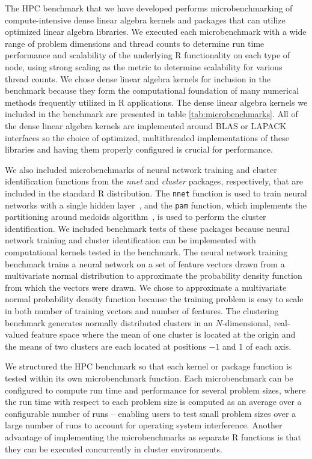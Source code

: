 The HPC benchmark that we have developed performs microbenchmarking of compute-intensive
dense linear algebra kernels and packages that can utilize optimized linear algebra
libraries. We executed each microbenchmark with a wide range of problem dimensions and
thread counts to determine run time performance and scalability of the underlying R
functionality on each type of node, using strong scaling as the metric to determine
scalability for various thread counts. We chose dense linear algebra kernels for inclusion
in the benchmark because they form the computational foundation of many numerical methods
frequently utilized in R applications. The dense linear algebra kernels we included in the
benchmark are presented in table \ref{tab:microbenchmarks}. All of the dense linear
algebra kernels are implemented around BLAS or LAPACK interfaces so the choice of
optimized, multithreaded implementations of these libraries and having them properly
configured is crucial for performance.

We also included microbenchmarks of neural network training and cluster identification
functions from the \textit{nnet} and \textit{cluster} packages, respectively, that are
included in the standard R distribution. The \texttt{nnet} function is used to train
neural networks with a single hidden layer~\cite{ripley:pattern96}, and the \texttt{pam}
function, which implements the partitioning around medoids algorithm~\cite{chu:kmedoids,
reynolds:clustering}, is used to perform the cluster identification. We included benchmark
tests of these packages because neural network training and cluster identification can be
implemented with computational kernels tested in the benchmark. The neural network
training benchmark trains a neural network on a set of feature vectors drawn from a
multivariate normal distribution to approximate the probability density function from
which the vectors were drawn. We chose to approximate a multivariate normal probability
density function because the training problem is easy to scale in both number of training
vectors and number of features. The clustering benchmark generates normally distributed
clusters in an $N$-dimensional, real-valued feature space where the mean of one cluster is
located at the origin and the means of two clusters are each located at positions $-1$ and
$1$ of each axis.

We structured the HPC benchmark so that each kernel or package function is tested within
its own microbenchmark function. Each microbenchmark can be configured to
compute run time and performance for several problem sizes, where the run time with
respect to each problem size is computed as an average over a configurable number of runs
-- enabling users to test small problem sizes over a large number of runs to account for
operating system interference. Another advantage of implementing the microbenchmarks as
separate R functions is that they can be executed concurrently in cluster environments.

